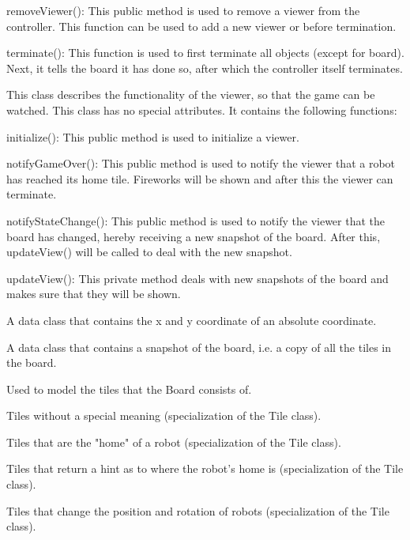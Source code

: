 \begin{description}
\begin{description}
            \item removeViewer(): This public method is used to remove a viewer from the controller. This function can be used to add a new viewer or before termination.
            \item terminate(): This function is used to first terminate all objects (except for board). Next, it tells the board it has done so, after which the controller itself terminates.
        \end{description} 
        \item[Viewer] This class describes the functionality of the viewer, so that the game can be watched. This class has no special attributes. It contains the following functions:
        \begin{description}
            \item initialize(): This public method is used to initialize a viewer.
            \item notifyGameOver(): This public method is used to notify the viewer that a robot has reached its home tile. Fireworks will be shown and after this the viewer can terminate.
            \item notifyStateChange(): This public method is used to notify the viewer that the board has changed, hereby receiving a new snapshot of the board. After this, updateView() will be called to deal with the new snapshot.
            \item updateView(): This private method deals with new snapshots of the board and makes sure that they will be shown.
        \end{description}
        \item[AbsoluteCoord] A data class that contains the x and y coordinate of an absolute coordinate.
		\item[BoardSnapshot] A data class that contains a snapshot of the board, i.e. a copy of all the tiles in the board.
		\item[Tile] Used to model the tiles that the Board consists of.
		\item[NormalTile] Tiles without a special meaning (specialization of the Tile class).
		\item[HomeTile] Tiles that are the "home" of a robot (specialization of the Tile class).
		\item[HintTile] Tiles that return a hint as to where the robot's home is (specialization of the Tile class).
		\item[ConveyorTile] Tiles that change the position and rotation of robots (specialization of the Tile class).

\end{description}
